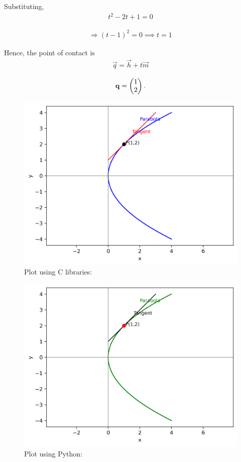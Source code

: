 \documentclass{beamer}
\numberwithin{equation}{section}
\begin{document}
Substituting,
\begin{align}
t^2 - 2t + 1 = 0
\end{align}

\begin{align}
\Rightarrow (t - 1)^2 = 0 \implies t = 1
\end{align}

Hence, the point of contact is
\begin{align}
\vec{q} = \vec{h} + t\vec{m} 
\end{align}

\begin{align}
 \mathbf{q} = \begin{pmatrix}1 \\ 2\end{pmatrix}.
\end{align}

\begin{figure}[H]
	\centering
	\includegraphics[scale=0.5]{img1}
	\caption*{Plot using C libraries:}
	\label{img1}
\end{figure}
\begin{figure}[H]
	\centering
	\includegraphics[scale=0.5]{img2}
	\caption*{
		Plot using Python:}
	\label{img2}
\end{figure}
\end{document}
